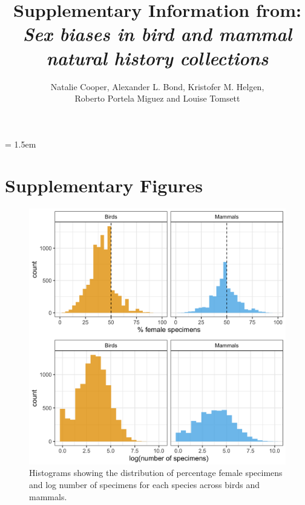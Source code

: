 \documentclass[a4paper, 12pt]{article}
\title{Supplementary Information from: \textit{Sex biases in bird and mammal natural history collections}}
\author{Natalie Cooper, 
  Alexander L. Bond,
  Kristofer M. Helgen,\\
  Roberto Portela Miguez and
  Louise Tomsett}
\date{}
\begin{document}
\maketitle

\parindent = 1.5em
\addtolength{\parskip}{.3em}


\section{Supplementary Figures} 

\begin{figure}
 \centering
  \includegraphics[width = \linewidth]{figures/histogram-specimen-counts.png}
  \caption{Histograms showing the distribution of percentage female specimens and log number of specimens for each species across birds and mammals.}
  \label{fig-histograms}
\end{figure}
\end{document}
